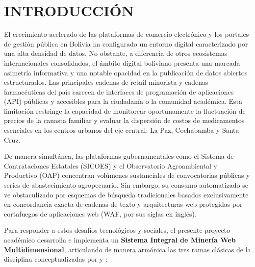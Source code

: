 \section{INTRODUCCIÓN}

El crecimiento acelerado de las plataformas de comercio electrónico y los portales de gestión pública en Bolivia ha configurado un entorno digital caracterizado por una alta densidad de datos. No obstante, a diferencia de otros ecosistemas internacionales consolidados, el ámbito digital boliviano presenta una marcada asimetría informativa y una notable opacidad en la publicación de datos abiertos estructurados. Las principales cadenas de retail minorista y cadenas farmacéuticas del país carecen de interfaces de programación de aplicaciones (API) públicas y accesibles para la ciudadanía o la comunidad académica. Esta limitación restringe la capacidad de monitorear oportunamente la fluctuación de precios de la canasta familiar y evaluar la dispersión de costos de medicamentos esenciales en los centros urbanos del eje central: La Paz, Cochabamba y Santa Cruz.

De manera simultánea, las plataformas gubernamentales como el Sistema de Contrataciones Estatales (SICOES) y el Observatorio Agroambiental y Productivo (OAP) concentran volúmenes sustanciales de convocatorias públicas y series de abastecimiento agropecuario. Sin embargo, su consumo automatizado se ve obstaculizado por esquemas de búsqueda tradicionales basados exclusivamente en concordancia exacta de cadenas de texto y arquitecturas web protegidas por cortafuegos de aplicaciones web (WAF, por sus siglas en inglés).

Para responder a estos desafíos tecnológicos y sociales, el presente proyecto académico desarrolla e implementa un \textbf{Sistema Integral de Minería Web Multidimensional}, articulando de manera armónica las tres ramas clásicas de la disciplina conceptualizadas por \citet{liu2011web} y \citet{han2012data}:

